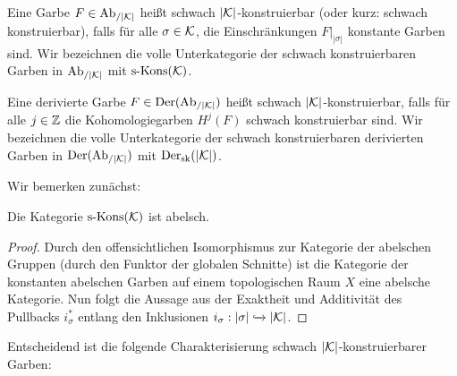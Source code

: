 
\begin{defn}
  Eine Garbe $F \in \operatorname{Ab}_{/|\mathcal{K}|}$ heißt schwach $|\mathcal{K}|$-konstruierbar (oder
  kurz: schwach konstruierbar), falls für alle $\sigma \in \mathcal{K}$, die
  Einschränkungen $F|_{|\sigma|}$ konstante Garben sind. Wir
  bezeichnen die volle Unterkategorie der schwach konstruierbaren
  Garben in $\operatorname{Ab}_{/|\mathcal{K}|}$ mit $\operatorname{s-Kons}(\mathcal{K})$.

  Eine derivierte Garbe $F \in \operatorname{Der}(\operatorname{Ab}_{/|\mathcal{K}|})$ heißt schwach
  $|\mathcal{K}|$-konstruierbar, falls für alle $j \in \mathbb{Z}$ die
  Kohomologiegarben $H^j(F)$ schwach konstruierbar sind. Wir
  bezeichnen die volle Unterkategorie der schwach konstruierbaren
  derivierten Garben in $\operatorname{Der}(\operatorname{Ab}_{/|\mathcal{K}|})$ mit $\operatorname{Der}_{\mathrm{sk}}(|\mathcal{K}|)$.
\end{defn}

Wir bemerken zunächst:

\begin{lemma}[\cite{KS}, 8.1.3] \label{skons-abelian}
  Die Kategorie $\operatorname{s-Kons}(\mathcal{K})$ ist abelsch.
\end{lemma}
\begin{proof}
  Durch den offensichtlichen Isomorphismus zur Kategorie der abelschen
  Gruppen (durch den Funktor der globalen Schnitte) ist die Kategorie
  der konstanten abelschen Garben auf einem topologischen Raum $X$
  eine abelsche Kategorie. Nun folgt die Aussage aus der Exaktheit und
  Additivität des Pullbacks $i_{\sigma}^*$ entlang den Inklusionen
  $i_{\sigma}: |\sigma| \xhookrightarrow{} |\mathcal{K}|$.
\end{proof}

Entscheidend ist die folgende Charakterisierung schwach
$|\mathcal{K}|$-konstruierbarer Garben:

